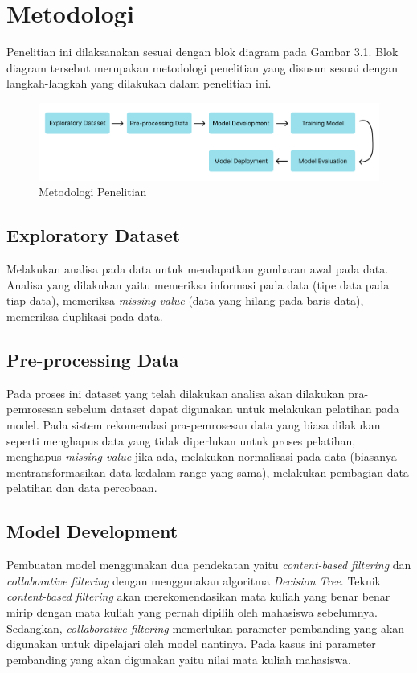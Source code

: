 \chapter{Metodologi}

Penelitian ini dilaksanakan sesuai dengan blok diagram pada Gambar 3.1. Blok diagram tersebut
merupakan metodologi penelitian yang disusun sesuai dengan langkah-langkah yang dilakukan dalam penelitian ini.

\begin{figure} [ht] \centering
  \includegraphics[width=160mm]{gambar/diagram-blok.png}
  \caption{Metodologi Penelitian}
\end{figure}


\section{Exploratory Dataset}
Melakukan analisa pada data untuk mendapatkan gambaran awal pada data. Analisa yang dilakukan yaitu
memeriksa informasi pada data (tipe data pada tiap data), memeriksa \emph{missing value} {(data yang hilang pada baris data)},
memeriksa duplikasi pada data.


\section{Pre-processing Data}
Pada proses ini dataset yang telah dilakukan analisa akan dilakukan pra-pemrosesan sebelum dataset dapat digunakan
untuk melakukan pelatihan pada model. Pada sistem rekomendasi pra-pemrosesan data yang biasa dilakukan seperti menghapus data
yang tidak diperlukan untuk proses pelatihan, menghapus \emph{missing value} jika ada, melakukan normalisasi pada data (biasanya mentransformasikan data kedalam range yang sama),
melakukan pembagian data pelatihan dan data percobaan.

\section{Model Development}
Pembuatan model menggunakan dua pendekatan yaitu \emph{content-based filtering} dan \emph{collaborative filtering} dengan menggunakan algoritma \emph{Decision Tree}. Teknik
\emph{content-based filtering} akan merekomendasikan mata kuliah yang benar benar mirip dengan mata kuliah yang pernah dipilih oleh mahasiswa sebelumnya. Sedangkan, \emph{collaborative filtering}
memerlukan parameter pembanding yang akan digunakan untuk dipelajari oleh model nantinya. Pada kasus ini parameter pembanding yang akan digunakan yaitu nilai mata kuliah mahasiswa.


